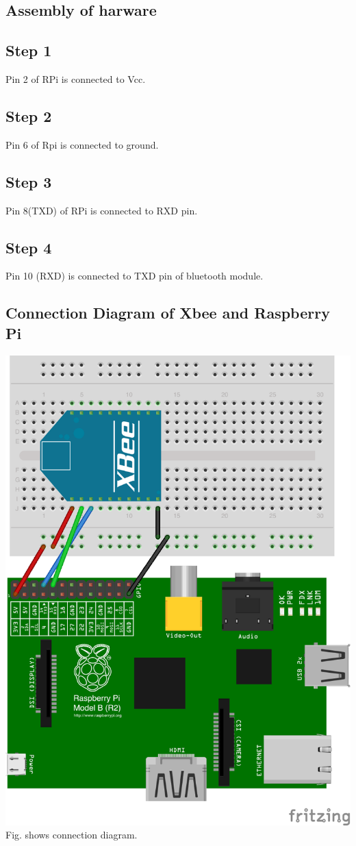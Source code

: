 \documentclass[a4paper,12pt,oneside]{book}
\begin{document}
\subsection*{Assembly of harware}
\subsection*{Step 1}
Pin 2 of RPi is connected to Vcc.
\subsection*{Step 2}
Pin 6 of Rpi is connected to ground.
\subsection*{Step 3}
Pin 8(TXD) of RPi is connected to RXD pin.
\subsection*{Step 4}
Pin 10 (RXD) is connected to TXD pin of bluetooth module.
\subsection*{Connection Diagram of Xbee and Raspberry Pi}
\centering
\includegraphics[scale=0.2]{raspi_to_xbee}
\flushleft
Fig. shows connection diagram.
\end{document}
